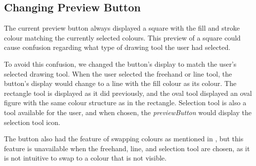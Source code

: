 \subsection{Changing Preview Button}
The current preview button always displayed a square with the fill and stroke colour matching the currently selected colours.
This preview of a square could cause confusion regarding what type of drawing tool the user had selected.

To avoid this confusion, we changed the button's display to match the user's selected drawing tool.
When the user selected the freehand or line tool, the button's display would change to a line with the fill colour as its colour.
The rectangle tool is displayed as it did previously, and the oval tool displayed an oval figure with the same colour structure as in the rectangle.
Selection tool is also a tool available for the user, and when chosen, the \textit{previewButton} would display the selection tool icon.

The button also had the feature of swapping colours as mentioned in , but this feature is unavailable when the freehand, line, and selection tool are chosen, as it is not intuitive to swap to a colour that is not visible.